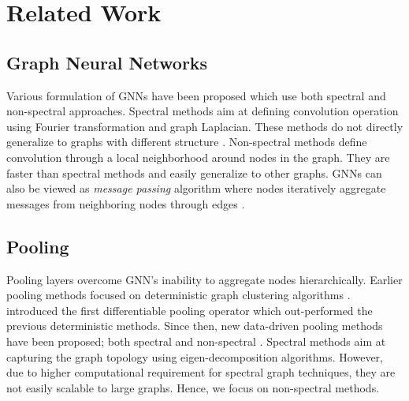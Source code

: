 \documentclass[letterpaper]{article} \usepackage{aaai20}  \usepackage{times}  \usepackage{helvet} \usepackage{courier}  \usepackage[hyphens]{url}  \usepackage{graphicx} \urlstyle{rm} \def\UrlFont{\rm}  \usepackage{graphicx}  \frenchspacing  \setlength{\pdfpagewidth}{8.5in}  \setlength{\pdfpageheight}{11in}
\begin{document}
\section{Related Work}



\subsection{Graph Neural Networks}
Various formulation of GNNs have been proposed which use both spectral and non-spectral approaches. Spectral methods \cite{spectral-gcn-1,spectral-gcn-2} aim at defining convolution operation using Fourier transformation and graph Laplacian. These methods do not directly generalize to graphs with different structure \cite{spec-not-general}. Non-spectral methods \cite{deterministic-graph-cluster-1,gcn,gin,monet,gConv} define convolution through a local neighborhood around nodes in the graph. They are faster than spectral methods and easily generalize to other graphs. GNNs can also be viewed as \textit{message passing} algorithm where nodes iteratively aggregate messages from neighboring nodes through edges \cite{message_passing}.


\subsection{Pooling}
Pooling layers overcome GNN's inability to aggregate nodes hierarchically. Earlier pooling methods focused on deterministic graph clustering algorithms \cite{deterministic-graph-cluster-1,deterministic-graph-cluster-2,deterministic-graph-cluster-3}. \citeauthor{diffpool} introduced the first differentiable pooling operator which out-performed the previous deterministic methods. Since then, new data-driven pooling methods have been proposed; both spectral \cite{eigen-pool,graclus} and non-spectral \cite{diffpool,topk}. Spectral methods aim at capturing the graph topology using eigen-decomposition algorithms. However, due to higher computational requirement for spectral graph techniques, they are not easily scalable to large graphs. Hence, we focus on non-spectral methods.
\end{document}
